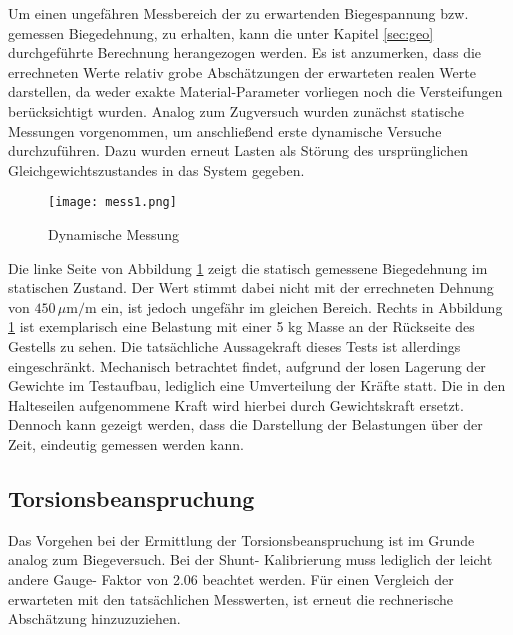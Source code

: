 Um einen ungefähren Messbereich der zu erwartenden Biegespannung bzw. gemessen Biegedehnung, zu erhalten, kann die unter Kapitel \ref{sec:geo} durchgeführte Berechnung herangezogen werden.
Es ist anzumerken, dass die errechneten Werte relativ grobe Abschätzungen der erwarteten realen Werte darstellen,
da weder exakte Material-Parameter vorliegen noch die Versteifungen berücksichtigt wurden. Analog zum Zugversuch wurden zunächst statische Messungen vorgenommen,
um anschließend erste dynamische Versuche durchzuführen. Dazu wurden erneut Lasten als Störung des ursprünglichen Gleichgewichtszustandes in das System gegeben.

\begin{figure}[htbp]
    \begin{center}
        \texttt{[image: mess1.png]}
        \caption[Dynamische Messung (Abbildungsverzeichnis)]{Dynamische Messung}
        
        \label{fig:mess1}
    \end{center}
\end{figure}


Die linke Seite von Abbildung \ref{fig:mess1} zeigt die statisch gemessene Biegedehnung im statischen Zustand. Der Wert stimmt dabei nicht mit der errechneten Dehnung von $450\,\mu\text{m/m}$ ein,
ist jedoch ungefähr im gleichen Bereich. Rechts in Abbildung \ref{fig:mess1} ist exemplarisch eine Belastung mit einer 5 kg Masse an der Rückseite des Gestells zu sehen.
Die tatsächliche Aussagekraft dieses Tests ist allerdings eingeschränkt. Mechanisch betrachtet findet, aufgrund der losen Lagerung der Gewichte im Testaufbau,
lediglich eine Umverteilung der Kräfte statt. Die in den Halteseilen aufgenommene Kraft wird hierbei durch Gewichtskraft ersetzt. Dennoch kann gezeigt werden,
dass die Darstellung der Belastungen über der Zeit, eindeutig gemessen werden kann.


\subsection{Torsionsbeanspruchung}
Das Vorgehen bei der Ermittlung der Torsionsbeanspruchung ist im Grunde analog zum Biegeversuch.
Bei der Shunt- Kalibrierung muss lediglich der leicht andere Gauge- Faktor von 2.06 beachtet werden.
Für einen Vergleich der erwarteten mit den tatsächlichen Messwerten, ist erneut die rechnerische Abschätzung hinzuzuziehen. 


